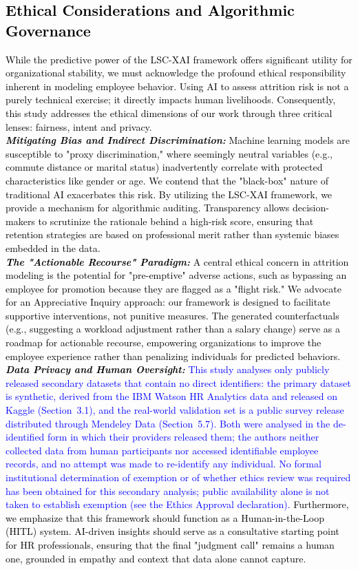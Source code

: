 \documentclass[a4paper,fleqn]{cas-sc}
\begin{document}
{\subsection{\textcolor{black}{Ethical Considerations and Algorithmic Governance}}
\textcolor{black}{While the predictive power of the LSC-XAI framework offers significant utility for organizational stability, we must acknowledge the profound ethical responsibility inherent in modeling employee behavior. Using AI to assess attrition risk is not a purely technical exercise; it directly impacts human livelihoods. Consequently, this study addresses the ethical dimensions of our work through three critical lenses: fairness, intent and privacy.\\
\textit{\textbf{Mitigating Bias and Indirect Discrimination:}}
Machine learning models are susceptible to "proxy discrimination," where seemingly neutral variables (e.g., commute distance or marital status) inadvertently correlate with protected characteristics like gender or age. We contend that the "black-box" nature of traditional AI exacerbates this risk. By utilizing the LSC-XAI framework, we provide a mechanism for algorithmic auditing. Transparency allows decision-makers to scrutinize the rationale behind a high-risk score, ensuring that retention strategies are based on professional merit rather than systemic biases embedded in the data.\\
\textit{\textbf{The "Actionable Recourse" Paradigm:}}
A central ethical concern in attrition modeling is the potential for "pre-emptive" adverse actions, such as bypassing an employee for promotion because they are flagged as a "flight risk." We advocate for an Appreciative Inquiry approach: our framework is designed to facilitate supportive interventions, not punitive measures. The generated counterfactuals (e.g., suggesting a workload adjustment rather than a salary change) serve as a roadmap for actionable recourse, empowering organizations to improve the employee experience rather than penalizing individuals for predicted behaviors.\\
\textit{\textbf{Data Privacy and Human Oversight:}}
\textcolor{blue}{This study analyses only publicly released secondary datasets that contain no direct identifiers: the primary dataset is synthetic, derived from the IBM Watson HR Analytics data and released on Kaggle (Section~3.1), and the real-world validation set is a public survey release distributed through Mendeley Data (Section~5.7). Both were analysed in the de-identified form in which their providers released them; the authors neither collected data from human participants nor accessed identifiable employee records, and no attempt was made to re-identify any individual. No formal institutional determination of exemption or of whether ethics review was required has been obtained for this secondary analysis; public availability alone is not taken to establish exemption (see the Ethics Approval declaration).} Furthermore, we emphasize that this framework should function as a Human-in-the-Loop (HITL) system. AI-driven insights should serve as a consultative starting point for HR professionals, ensuring that the final "judgment call" remains a human one, grounded in empathy and context that data alone cannot capture.}\\
}
\end{document}
